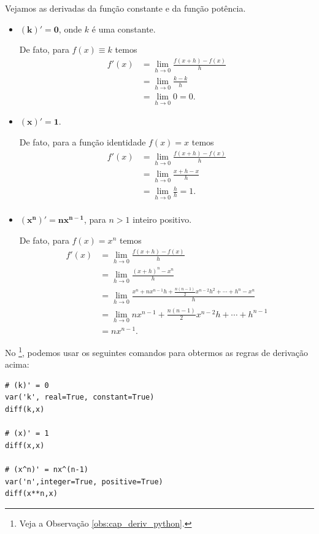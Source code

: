 Vejamos as derivadas da função constante e da função potência.
\begin{itemize}
\item $\pmb{(k)' = 0}$, onde $k$ é uma constante.

  De fato, para $f(x) \equiv k$ temos
  \begin{align}
    f'(x) &= \lim_{h\to 0} \frac{f(x+h)-f(x)}{h}\\
          &= \lim_{h\to 0} \frac{k-k}{h} \\
          &= \lim_{h\to 0} 0 = 0.
  \end{align}

\item $\pmb{(x)' = 1}$.

  De fato, para a função identidade $f(x) = x$ temos
  \begin{align}
    f'(x) &= \lim_{h\to 0} \frac{f(x+h)-f(x)}{h}\\
          &= \lim_{h\to 0} \frac{x+h-x}{h}\\
          &= \lim_{h\to 0} \frac{h}{h} = 1.\\
  \end{align}

\item $\pmb{(x^n)' = nx^{n-1}}$, para $n > 1$ inteiro positivo.

  De fato, para $f(x) = x^n$ temos
  \begin{align}
    f'(x) &= \lim_{h\to 0} \frac{f(x+h)-f(x)}{h}\\
          &= \lim_{h\to 0} \frac{(x+h)^n-x^n}{h} \\
          &= \lim_{h\to 0} \frac{x^n+nx^{n-1}h+\frac{n(n-1)}{2}x^{n-2}h^2 + \cdots +h^n-x^n}{h}\\
          &= \lim_{h\to 0} nx^{n-1}+\frac{n(n-1)}{2}x^{n-2}h+\cdots+h^{n-1}\\
          &= nx^{n-1}.
  \end{align}
\end{itemize}

\ifispython
No \sympy\footnote{Veja a Observação \ref{obs:cap_deriv_python}.}, podemos usar os seguintes comandos para obtermos as regras de derivação acima:
\begin{verbatim}
# (k)' = 0
var('k', real=True, constant=True)
diff(k,x)

# (x)' = 1
diff(x,x)

# (x^n)' = nx^(n-1)
var('n',integer=True, positive=True)
diff(x**n,x)
\end{verbatim}
\fi

